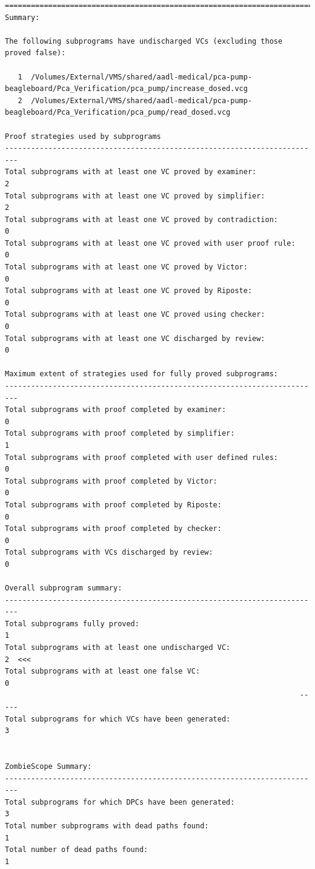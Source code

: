 \begin{lstlisting}[frame=single, gobble=0, caption={POGS report}]
===============================================================================
Summary:

The following subprograms have undischarged VCs (excluding those proved false):

   1  /Volumes/External/VMS/shared/aadl-medical/pca-pump-beagleboard/Pca_Verification/pca_pump/increase_dosed.vcg
   2  /Volumes/External/VMS/shared/aadl-medical/pca-pump-beagleboard/Pca_Verification/pca_pump/read_dosed.vcg

Proof strategies used by subprograms
-------------------------------------------------------------------------
Total subprograms with at least one VC proved by examiner:              2
Total subprograms with at least one VC proved by simplifier:            2
Total subprograms with at least one VC proved by contradiction:         0
Total subprograms with at least one VC proved with user proof rule:     0
Total subprograms with at least one VC proved by Victor:                0
Total subprograms with at least one VC proved by Riposte:               0
Total subprograms with at least one VC proved using checker:            0
Total subprograms with at least one VC discharged by review:            0

Maximum extent of strategies used for fully proved subprograms:
-------------------------------------------------------------------------
Total subprograms with proof completed by examiner:                     0
Total subprograms with proof completed by simplifier:                   1
Total subprograms with proof completed with user defined rules:         0
Total subprograms with proof completed by Victor:                       0
Total subprograms with proof completed by Riposte:                      0
Total subprograms with proof completed by checker:                      0
Total subprograms with VCs discharged by review:                        0

Overall subprogram summary:
-------------------------------------------------------------------------
Total subprograms fully proved:                                         1
Total subprograms with at least one undischarged VC:                    2  <<<
Total subprograms with at least one false VC:                           0
                                                                    -----
Total subprograms for which VCs have been generated:                    3


ZombieScope Summary:
-------------------------------------------------------------------------
Total subprograms for which DPCs have been generated:                   3
Total number subprograms with dead paths found:                         1
Total number of dead paths found:                                       1



\end{lstlisting}
